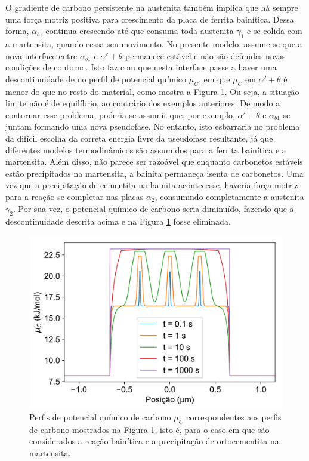 O gradiente de carbono persistente na austenita também implica que há sempre uma força motriz positiva para crescimento da placa de ferrita bainítica. Dessa forma, $\alpha_{b1}$ continua crescendo até que consuma toda austenita $\gamma_1$ e se colida com a martensita, quando cessa seu movimento. No presente modelo, assume-se que a nova interface entre $\alpha_{b1}$ e $\alpha' + \theta$ permanece estável e não são definidas novas condições de contorno. Isto faz com que nesta interface passe a haver uma descontinuidade de no perfil de potencial químico $\mu_C$, em que $\mu_C$ em $\alpha' + \theta$ é menor do que no resto do material, como mostra a Figura \ref{fig:muprofiles_coupled_CCEortho}. Ou seja, a situação limite não é de equilíbrio, ao contrário dos exemplos anteriores. De modo a contornar esse problema, poderia-se assumir que, por exemplo, $\alpha' + \theta$ e $\alpha_{b1}$ se juntam formando uma nova pseudofase. No entanto, isto esbarraria no problema da difícil escolha da correta energia livre da pseudofase resultante, já que diferentes modelos termodinâmicos são assumidos para a ferrita bainítica e a martensita. Além disso, não parece ser razoável que enquanto carbonetos estáveis estão precipitados na martensita, a bainita permaneça isenta de carbonetos. Uma vez que a precipitação de cementita na bainita acontecesse, haveria força motriz para a reação se completar nas placas $\alpha_2$, consumindo completamente a austenita $\gamma_2$. Por sua vez, o potencial químico de carbono seria diminuído, fazendo que a descontinuidade descrita acima e na Figura \ref{fig:muprofiles_coupled_CCEortho} fosse eliminada.

\begin{figure}
  \includegraphics[width=.8\textwidth]{img/cpartition/muprofiles/coupled_FoFo_375_CCEortho.pdf}
  \caption{Perfis de potencial químico de carbono $\mu_C$ correspondentes aos perfis de carbono mostrados na Figura \ref{fig:muprofiles_coupled_CCEortho}, isto é, para o caso em que são considerados a reação bainítica e a precipitação de ortocementita na martensita.}
  \label{fig:muprofiles_coupled_CCEortho}
\end{figure}

